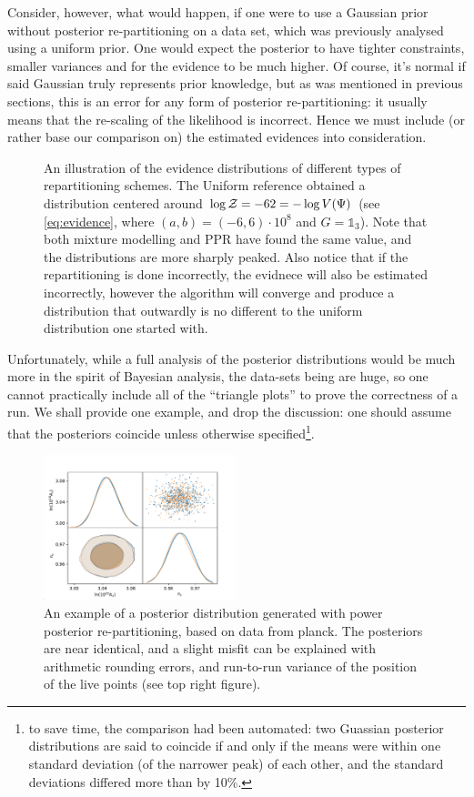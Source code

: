 \documentclass[usenatbib]{mnras}
\begin{document}
Consider, however, what would happen, if one were to use a Gaussian
prior without posterior re-partitioning on a data set, which was
previously analysed using a uniform prior. One would expect the
posterior to have tighter constraints, smaller variances and for
the evidence to be much higher. Of course, it's normal if said
Gaussian truly represents prior knowledge, but as was mentioned in
previous sections, this is an error for any form of posterior
re-partitioning: it usually means that the re-scaling of the
likelihood is incorrect. Hence we must include (or rather base our
comparison on) the estimated evidences into consideration.

\begin{figure}

\caption{\label{org9c95c61}
An illustration of the evidence distributions of different types of repartitioning schemes. The Uniform reference obtained a distribution centered around \(\log {\cal Z} = -62 = - \log V(\Psi)\) (see \autoref{eq:evidence}, where \((a,b)=(-6, 6)\cdot 10^{8}\) and \(G=\mathds{1}_{3}\)). Note that both mixture modelling and PPR have found the same value, and the distributions are more sharply peaked. Also notice that if the repartitioning is done incorrectly, the evidnece will also be estimated incorrectly, however the algorithm will converge and produce a distribution that outwardly is no different to the uniform distribution one started with.}
\end{figure}

Unfortunately, while a full analysis of the posterior distributions
would be much more in the spirit of Bayesian analysis, the data-sets
being are huge, so one cannot practically include all of
the ``triangle plots'' to prove the correctness of a run. We shall
provide one example, and drop the discussion: one should assume
that the posteriors coincide unless otherwise specified\footnote{to save time, the comparison had been automated: two Guassian
posterior distributions are said to coincide if and only if the means
were within one standard deviation (of the narrower peak) of each
other, and the standard deviations differed more than by 10\%.}. 

\begin{figure}
 \includegraphics[width=0.5\textwidth]{./illustrations/misfit.pdf}
\caption{\label{org92cc8c5}
An example of a posterior distribution generated with power posterior re-partitioning, based on data from planck. The posteriors are near identical, and a slight misfit can be explained with arithmetic rounding errors, and run-to-run variance of the position of the live points (see top right figure).}
\end{figure}
\end{document}
